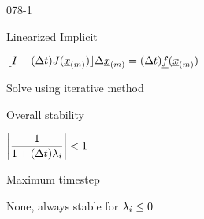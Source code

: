 \begin{mitframe}{078-1}
\begin{listone}
\begin{listtwo}
		\item Linearized Implicit
		\begin{listthree}
			\item $\lfloor\mominertia-(\iipf\timet)J(\uline{\disp}_{(\mass)})\rfloor\iipf\uline{\disp}_{(\mass)}=(\iipf\timet)\uline{\fug}(\uline{\disp}_{(\mass)})$
			\item Solve using iterative method
		\end{listthree}
            
		\item Overall stability
		\begin{listthree}
			\item $\bigg|\dfrac{1}{1+(\iipf\timet)\wavel_{\state}}\bigg|<1$         
		\end{listthree}
        
        \item Maximum timestep
        \begin{listthree}
        	\item None, always stable for $\wavel_{\state}\leq{0}$
        \end{listthree}
	\end{listtwo}
\end{listone}   
\end{mitframe}